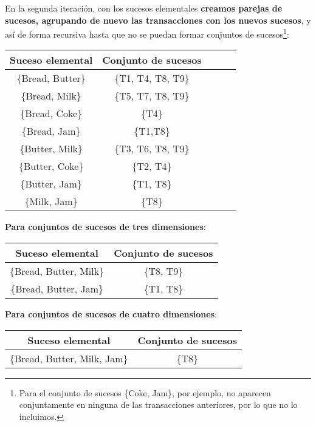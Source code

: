 \documentclass [a4paper] {article}
\begin{document}
En la segunda iteración, con los sucesos elementales \textbf{creamos parejas de sucesos, agrupando de nuevo las transacciones con los nuevos sucesos}, y así de forma recursiva hasta que no se puedan formar
conjuntos de sucesos\footnote{Para el conjunto de sucesos \{Coke, Jam\}, por ejemplo, no aparecen conjuntamente en ninguna de las transacciones anteriores, por lo que no lo incluimos.}:

\begin{center}
\begin{tabular}{|c|c|c|c|c|}
\hline
Suceso elemental   & Conjunto de sucesos             \\ \hline
\{Bread, Butter\}  & \{T1, T4, T8, T9\}              \\ \hline
\{Bread, Milk\}    & \{T5, T7, T8, T9\}              \\ \hline
\{Bread, Coke\}    & \{T4\}                          \\ \hline
\{Bread, Jam\}     & \{T1,T8\}                       \\ \hline
\{Butter, Milk\}   & \{T3, T6, T8, T9\}              \\ \hline
\{Butter, Coke\}   & \{T2, T4\}                      \\ \hline
\{Butter, Jam\}    & \{T1, T8\}                      \\ \hline
\{Milk, Jam\}      & \{T8\}                          \\ \hline
\end{tabular}
\end{center}

\textbf{Para conjuntos de sucesos de tres dimensiones}:
\begin{center}
\begin{tabular}{|c|c|}
\hline
Suceso elemental   & Conjunto de sucesos             \\ \hline
\{Bread, Butter, Milk\}  & \{T8, T9\}                \\ \hline
\{Bread, Butter, Jam\}    & \{T1, T8\}               \\ \hline
\end{tabular}
\end{center}

\textbf{Para conjuntos de sucesos de cuatro dimensiones}:
\begin{center}
\begin{tabular}{|c|c|}
\hline
Suceso elemental   & Conjunto de sucesos             \\ \hline
\{Bread, Butter, Milk, Jam\}  & \{T8\}                \\ \hline
\end{tabular}
\end{center}
\end{document}
